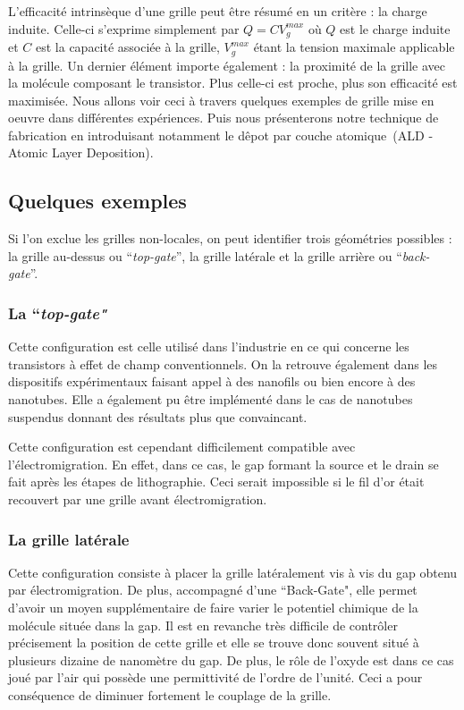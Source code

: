 L'efficacité intrinsèque d'une grille peut être résumé en un critère : la charge induite. Celle-ci s'exprime simplement par $Q = CV_g^{max}$ où $Q$ est le charge induite et $C$ est la capacité associée à la grille, $V_g^{max}$ étant la tension maximale applicable à la grille. Un dernier élément importe également : la proximité de la grille avec la molécule composant le transistor. Plus celle-ci est proche, plus son efficacité est maximisée. Nous allons voir ceci à travers quelques exemples de grille mise en oeuvre dans différentes expériences. Puis nous présenterons notre technique de fabrication en introduisant notamment le dêpot par couche atomique~(ALD - Atomic Layer Deposition).

\subsection{Quelques exemples}
Si l'on exclue les grilles non-locales, on peut identifier trois géométries possibles : la grille au-dessus ou  ``\textit{top-gate}'', la grille latérale et la grille arrière ou  ``\textit{back-gate}''.

\subsubsection{La ``\textit{top-gate"}}
Cette configuration est celle utilisé dans l'industrie en ce qui concerne les transistors à effet de champ conventionnels. On la retrouve également dans les dispositifs expérimentaux faisant appel à des nanofils ou bien encore à des nanotubes. Elle a également pu être implémenté dans le cas de nanotubes suspendus donnant des résultats plus que convaincant.

Cette configuration est cependant difficilement compatible avec l'électromigration. En effet, dans ce cas, le gap formant la source et le drain se fait après les étapes de lithographie. Ceci serait impossible si le fil d'or était recouvert par une grille avant électromigration.

\subsubsection{La grille latérale}
Cette configuration consiste à placer la grille latéralement vis à vis du gap obtenu par électromigration. De plus, accompagné d'une ``Back-Gate", elle permet d'avoir un moyen supplémentaire de faire varier le potentiel chimique de la molécule située dans la gap. Il est en revanche très difficile de contr\^oler précisement la position de cette grille et elle se trouve donc souvent situé à plusieurs dizaine de nanomètre du gap. De plus, le r\^ole de l'oxyde est dans ce cas joué par l'air qui possède une permittivité de l'ordre de l'unité. Ceci a pour conséquence de diminuer fortement le couplage de la grille.


